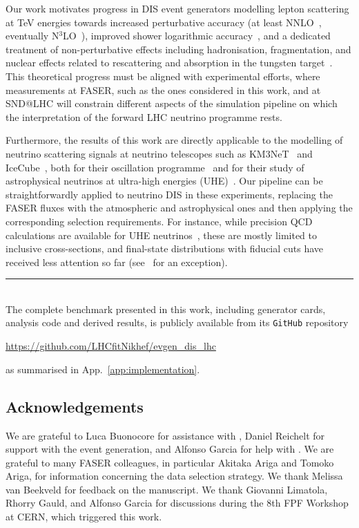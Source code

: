 Our work motivates progress in DIS event generators modelling lepton scattering at TeV energies towards increased perturbative accuracy (at least NNLO~\cite{Monni:2019whf,Hoche:2018gti}, eventually N$^3$LO~\cite{Vermaseren:2005qc,Moch:2004xu,Moch:2008fj,Currie:2018fgr}), improved shower logarithmic accuracy~\cite{vanBeekveld:2023chs,vanBeekveld:2022ukn}, and a dedicated treatment of non-perturbative effects including hadronisation, fragmentation, and nuclear effects related to rescattering and absorption in the tungsten target~\cite{Sjostrand:2020gyg}.
%
This theoretical progress must be aligned with experimental efforts, where measurements at FASER, such as the ones considered in this work, and at SND@LHC will constrain different aspects of the simulation pipeline on which the interpretation of the forward LHC neutrino programme rests.

Furthermore, the results of this work are directly applicable to the modelling of neutrino scattering signals at neutrino telescopes such as KM3NeT~\cite{KM3Net:2016zxf,KM3NeT:2021ozk} and IceCube~\cite{IceCube:2016zyt,IceCube:2013low}, both for their oscillation programme~\cite{IceCube:2017lak,IceCube:2023ewe,KM3NeT:2021ozk} and for their study of astrophysical neutrinos at ultra-high energies (UHE)~\cite{IceCube:2014stg,KM3NeT:2025npi,IceCube:2017roe,IceCube:2018pgc}.
%
Our pipeline can be straightforwardly applied to neutrino DIS in these experiments, replacing the FASER fluxes with the atmospheric and astrophysical ones and then applying the corresponding selection requirements.
%
For instance, while precision QCD calculations are available for UHE neutrinos~\cite{Gandhi:1998ri,Connolly:2011vc,Cooper-Sarkar:2011jtt,Gauld:2019pgt,Garcia:2020jwr,Xie:2023suk}, these are mostly limited to inclusive cross-sections, and final-state distributions with fiducial cuts have received less attention so far (see~\cite{FerrarioRavasio:2024kem} for an exception).

\bigskip

\rule{12cm}{0.4pt}\\

The complete benchmark presented in this work, including generator cards, analysis code and derived results, is publicly available from its {\tt GitHub} repository
\begin{center}
\url{https://github.com/LHCfitNikhef/evgen_dis_lhc}
\end{center}
as summarised in App.~\ref{app:implementation}.

\subsection*{Acknowledgements}

We are grateful to Luca Buonocore for assistance with \powhegtwo, Daniel Reichelt for support with the \sherpa event generation, and Alfonso Garcia for help with \genie. 
%
We are grateful to many FASER colleagues, in particular Akitaka Ariga and Tomoko Ariga, for information concerning the data selection strategy.
%
We thank Melissa van Beekveld for feedback on the manuscript.
%
We thank Giovanni Limatola, Rhorry Gauld, and Alfonso Garcia for discussions during the 8th FPF Workshop at CERN, which triggered this work. 
